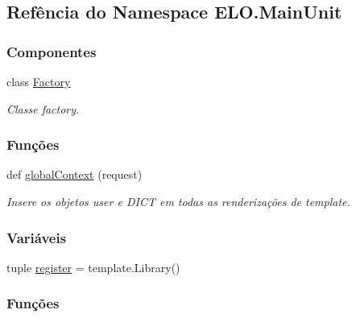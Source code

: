 \hypertarget{namespaceELO_1_1MainUnit}{}\subsection{Refência do Namespace E\+L\+O.\+Main\+Unit}
\label{namespaceELO_1_1MainUnit}
\subsubsection*{Componentes}
\begin{DoxyCompactItemize}
\item 
class \hyperlink{classELO_1_1MainUnit_1_1Factory}{Factory}
\begin{DoxyCompactList}\small\item\em Classe factory. \end{DoxyCompactList}\end{DoxyCompactItemize}
\subsubsection*{Funções}
\begin{DoxyCompactItemize}
\item 
def \hyperlink{namespaceELO_1_1MainUnit_a9a93b85d475fc34f726b09b8649be247}{global\+Context} (request)
\begin{DoxyCompactList}\small\item\em Insere os objetos user e D\+I\+C\+T em todas as renderizações de template. \end{DoxyCompactList}\end{DoxyCompactItemize}
\subsubsection*{Variáveis}
\begin{DoxyCompactItemize}
\item 
tuple \hyperlink{namespaceELO_1_1MainUnit_ac11441626deff8b14faad131d56cc790}{register} = template.\+Library()
\end{DoxyCompactItemize}


\subsubsection{Funções}
\hypertarget{namespaceELO_1_1MainUnit_a9a93b85d475fc34f726b09b8649be247}{}

